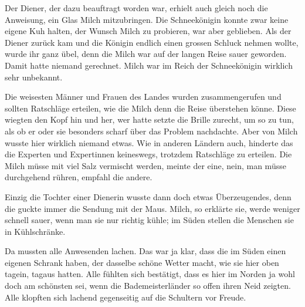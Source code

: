 Der Diener, der dazu beauftragt worden war, erhielt auch gleich noch die Anweisung, ein Glas Milch mitzubringen. Die Schneekönigin konnte zwar keine eigene Kuh halten, der Wunsch Milch zu probieren, war aber geblieben. Als der Diener zurück kam und die Königin endlich einen grossen Schluck nehmen wollte, wurde ihr ganz übel, denn die Milch war auf der langen Reise sauer geworden. Damit hatte niemand gerechnet. Milch war im Reich der Schneekönigin wirklich sehr unbekannt. 

Die weisesten Männer und Frauen des Landes wurden zusammengerufen und sollten
Ratschläge erteilen, wie die Milch denn die Reise überstehen könne. Diese
wiegten den Kopf hin und her, wer hatte setzte die Brille zurecht, um so zu
tun, als ob er oder sie besonders scharf über das Problem nachdachte. Aber von
Milch wusste hier wirklich niemand etwas. Wie in anderen Ländern auch, hinderte
das die Experten und Expertinnen keineswegs, trotzdem Ratschläge zu erteilen. Die Milch müsse mit viel Salz vermischt werden, meinte der eine, nein, man müsse durchgehend rühren, empfahl die andere. 

Einzig die Tochter einer Dienerin wusste dann doch etwas Überzeugendes, denn die guckte immer die Sendung mit der Maus. Milch, so erklärte sie, werde weniger schnell sauer, wenn man sie nur richtig kühle; im Süden stellen die Menschen sie in Kühlschränke.

Da mussten alle Anwesenden lachen. Das war ja klar, dass die im Süden einen
eigenen Schrank haben, der dasselbe schöne Wetter macht, wie sie hier oben
tagein, tagaus hatten. Alle fühlten sich bestätigt, dass es hier im Norden ja
wohl doch am schönsten sei, wenn die Bademeisterländer so offen ihren Neid
zeigten. Alle klopften sich lachend gegenseitig auf die Schultern vor Freude.

